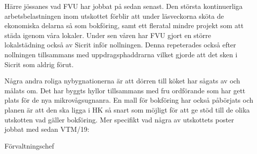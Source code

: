 \documentclass[../_main/handlingar.tex]{subfiles}
\begin{document}

Härre jössanes vad FVU har jobbat på sedan senast. Den största kontinuerliga arbetsbelastningen inom utskottet förblir att under läsveckorna sköta de ekonomiska delarna så som bokföring, samt ett fleratal mindre projekt som att städa igenom våra lokaler. 
Under sen våren har FVU gjort en större lokalstädning också av Sicrit inför nollningen. Denna repeterades också efter nollningen tillsammans med uppdragsphaddrarna vilket gjorde att det sken i Sicrit som aldrig förut.

Några andra roliga nybygnationerna är att dörren till köket har sågats av och målats om. 
Det har byggts hyllor tillsammans med fru ordförande som har gett plats för de nya mikrovågsugnanra. En mall för bokföring har också påbörjats och planen är att den ska  ligga i HK så snart som möjligt för att ge stöd till de olika utskotten vad gäller bokföring. Mer specifikt vad några av utskottets poster jobbat med sedan VTM/19:


\begin{signatures}{1}
    \mvh
    \signature{Henrik Ramström}{Förvaltningschef}
\end{signatures}
\end{document}
